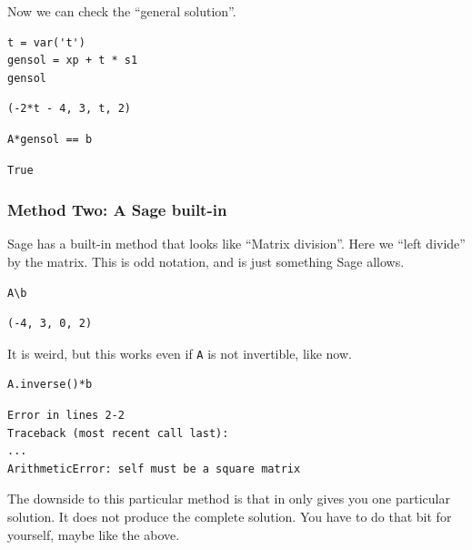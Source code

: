 \documentclass[10pt,]{book}
\theoremstyle{plain}
\numberwithin{equation}{section}
\begin{document}
        Now we can check the ``general solution''.
\begin{lstlisting}[style=sageinput]
t = var('t')
gensol = xp + t * s1
gensol
\end{lstlisting}
\begin{lstlisting}[style=sageoutput]
(-2*t - 4, 3, t, 2)
\end{lstlisting}
\begin{lstlisting}[style=sageinput]
A*gensol == b
\end{lstlisting}
\begin{lstlisting}[style=sageoutput]
True
\end{lstlisting}
\typeout{************************************************}
\typeout{************************************************}
\subsubsection[Method Two: A Sage built-in]{Method Two: A Sage built-in}\label{subsubsection-37}

        Sage has a built-in method that looks like ``Matrix division''. Here
        we ``left divide'' by the matrix. This is odd notation, and is just
        something Sage allows.
\begin{lstlisting}[style=sageinput]
A\b
\end{lstlisting}
\begin{lstlisting}[style=sageoutput]
(-4, 3, 0, 2)
\end{lstlisting}
\par

        It is weird, but this works even if \verb?A? is not invertible, like now.
\begin{lstlisting}[style=sageinput]
A.inverse()*b
\end{lstlisting}
\begin{lstlisting}[style=sageoutput]
Error in lines 2-2
Traceback (most recent call last):
...
ArithmeticError: self must be a square matrix
\end{lstlisting}
\par

        The downside to this particular method is that in only gives you one
        particular solution. It does not produce the complete solution. You have
        to do that bit for yourself, maybe like the above.
\typeout{************************************************}
\typeout{************************************************}
\end{document}
